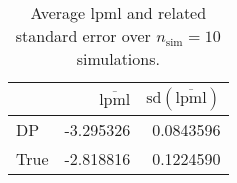 \begin{table}[H]

\caption{Average lpml and related standard error over $n_{\text{sim}} = 10$ simulations.}
\centering
\begin{tabular}[t]{lrr}
\toprule
  & $\overbar{\text{lpml}}$ & $\text{sd}(\overbar{\text{lpml}})$\\
\midrule
DP & -3.295326 & 0.0843596\\
True & -2.818816 & 0.1224590\\
\bottomrule
\end{tabular}
\end{table}